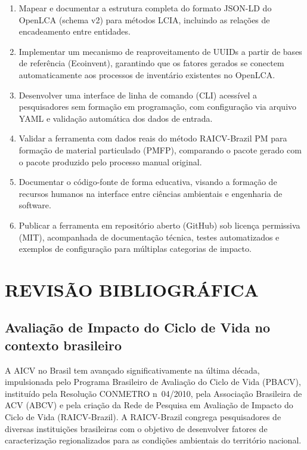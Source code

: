 \begin{enumerate}[label=\arabic*.]
    \item Mapear e documentar a estrutura completa do formato JSON-LD do OpenLCA (schema v2) para m\'etodos LCIA, incluindo as rela\c{c}\~oes de encadeamento entre entidades.
    \item Implementar um mecanismo de reaproveitamento de UUIDs a partir de bases de refer\^encia (Ecoinvent), garantindo que os fatores gerados se conectem automaticamente aos processos de invent\'ario existentes no OpenLCA.
    \item Desenvolver uma interface de linha de comando (CLI) acess\'ivel a pesquisadores sem forma\c{c}\~ao em programa\c{c}\~ao, com configura\c{c}\~ao via arquivo YAML e valida\c{c}\~ao autom\'atica dos dados de entrada.
    \item Validar a ferramenta com dados reais do m\'etodo RAICV-Brazil PM para forma\c{c}\~ao de material particulado (PMFP), comparando o pacote gerado com o pacote produzido pelo processo manual original.
    \item Documentar o c\'odigo-fonte de forma educativa, visando a forma\c{c}\~ao de recursos humanos na interface entre ci\^encias ambientais e engenharia de software.
    \item Publicar a ferramenta em reposit\'orio aberto (GitHub) sob licen\c{c}a permissiva (MIT), acompanhada de documenta\c{c}\~ao t\'ecnica, testes automatizados e exemplos de configura\c{c}\~ao para m\'ultiplas categorias de impacto.
\end{enumerate}

\section{REVIS\~AO BIBLIOGR\'AFICA}

\subsection{Avalia\c{c}\~ao de Impacto do Ciclo de Vida no contexto brasileiro}

A AICV no Brasil tem avan\c{c}ado significativamente na \'ultima d\'ecada, impulsionada pelo Programa Brasileiro de Avalia\c{c}\~ao do Ciclo de Vida (PBACV), institu\'ido pela Resolu\c{c}\~ao CONMETRO n\textdegree\ 04/2010, pela Associação Brasileira de ACV (ABCV) e pela cria\c{c}\~ao da Rede de Pesquisa em Avalia\c{c}\~ao de Impacto do Ciclo de Vida (RAICV-Brazil). A RAICV-Brazil congrega pesquisadores de diversas institui\c{c}\~oes brasileiras com o objetivo de desenvolver fatores de caracteriza\c{c}\~ao regionalizados para as condi\c{c}\~oes ambientais do territ\'orio nacional.

